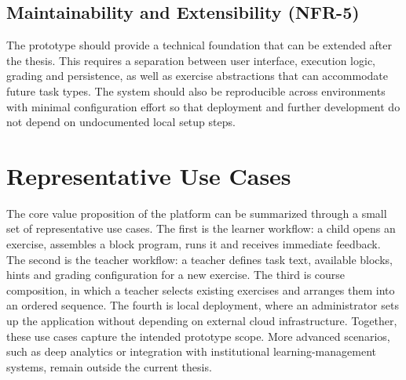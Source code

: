\subsection*{Maintainability and Extensibility (NFR-5)}
The prototype should provide a technical foundation that can be extended after the thesis.
This requires a separation between user interface, execution logic, grading and persistence, as well as exercise abstractions that can accommodate future task types.
The system should also be reproducible across environments with minimal configuration effort so that deployment and further development do not depend on undocumented local setup steps.


\section{Representative Use Cases}
The core value proposition of the platform can be summarized through a small set of representative use cases. The first is the learner workflow: a child opens an exercise, assembles a block program, 
runs it and receives immediate feedback. The second is the teacher workflow: a teacher defines task text, available blocks, hints and grading configuration for a new exercise. 
The third is course composition, in which a teacher selects existing exercises and arranges them into an ordered sequence.
The fourth is local deployment, where an administrator sets up the application without depending on external cloud infrastructure.
Together, these use cases capture the intended prototype scope. More advanced scenarios, such as deep analytics or integration with institutional learning-management systems, remain outside
the current thesis.
